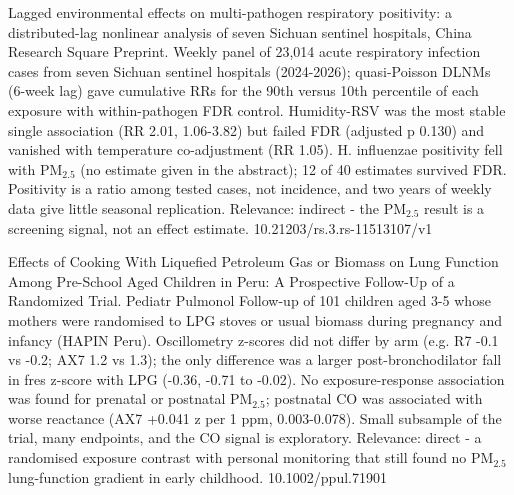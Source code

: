 \documentclass[10pt]{article}
\begin{document}
\par{}\baselineskip{}\baselineskip
{}

{Lagged environmental effects on multi-pathogen respiratory positivity: a distributed-lag nonlinear analysis of seven Sichuan sentinel hospitals, China}
{Research Square}
{Preprint. Weekly panel of 23,014 acute respiratory infection cases from seven Sichuan sentinel hospitals (2024-2026); quasi-Poisson DLNMs (6-week lag) gave cumulative RRs for the 90th versus 10th percentile of each exposure with within-pathogen FDR control. Humidity-RSV was the most stable single association (RR 2.01, 1.06-3.82) but failed FDR (adjusted p 0.130) and vanished with temperature co-adjustment (RR 1.05). H. influenzae positivity fell with PM$_{2.5}$ (no estimate given in the abstract); 12 of 40 estimates survived FDR. Positivity is a ratio among tested cases, not incidence, and two years of weekly data give little seasonal replication. Relevance: indirect - the PM$_{2.5}$ result is a screening signal, not an effect estimate.}
{10.21203/rs.3.rs-11513107/v1}

{Effects of Cooking With Liquefied Petroleum Gas or Biomass on Lung Function Among Pre-School Aged Children in Peru: A Prospective Follow-Up of a Randomized Trial.}
{Pediatr Pulmonol}
{Follow-up of 101 children aged 3-5 whose mothers were randomised to LPG stoves or usual biomass during pregnancy and infancy (HAPIN Peru). Oscillometry z-scores did not differ by arm (e.g. R7 -0.1 vs -0.2; AX7 1.2 vs 1.3); the only difference was a larger post-bronchodilator fall in fres z-score with LPG (-0.36, -0.71 to -0.02). No exposure-response association was found for prenatal or postnatal PM$_{2.5}$; postnatal CO was associated with worse reactance (AX7 +0.041 z per 1 ppm, 0.003-0.078). Small subsample of the trial, many endpoints, and the CO signal is exploratory. Relevance: direct - a randomised exposure contrast with personal monitoring that still found no PM$_{2.5}$ lung-function gradient in early childhood.}
{10.1002/ppul.71901}
\end{document}
